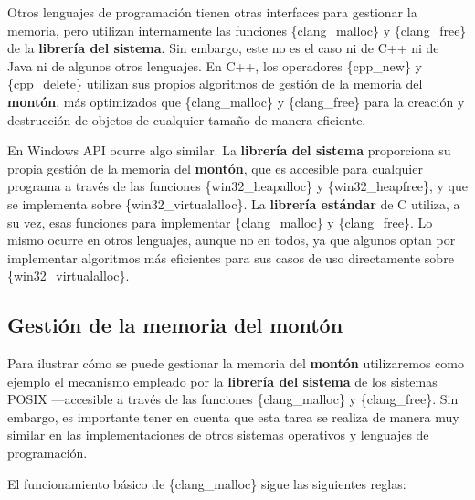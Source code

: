 Otros lenguajes de programación tienen otras interfaces para gestionar
la memoria, pero utilizan internamente las funciones \{clang\_malloc\} y
\{clang\_free\} de la \textbf{librería del sistema}. Sin embargo, este
no es el caso ni de C++ ni de Java ni de algunos otros lenguajes. En
C++, los operadores \{cpp\_new\} y \{cpp\_delete\} utilizan sus propios
algoritmos de gestión de la memoria del \textbf{montón}, más optimizados
que \{clang\_malloc\} y \{clang\_free\} para la creación y destrucción
de objetos de cualquier tamaño de manera eficiente.

En Windows API ocurre algo similar. La \textbf{librería del sistema}
proporciona su propia gestión de la memoria del \textbf{montón}, que es
accesible para cualquier programa a través de las funciones
\{win32\_heapalloc\} y \{win32\_heapfree\}, y que se implementa sobre
\{win32\_virtualalloc\}. La \textbf{librería estándar} de C utiliza, a
su vez, esas funciones para implementar \{clang\_malloc\} y
\{clang\_free\}. Lo mismo ocurre en otros lenguajes, aunque no en todos,
ya que algunos optan por implementar algoritmos más eficientes para sus
casos de uso directamente sobre \{win32\_virtualalloc\}.

\subsection{Gestión de la memoria del
montón}\label{_gestiuxf3n_de_la_memoria_del_montuxf3n}

Para ilustrar cómo se puede gestionar la memoria del \textbf{montón}
utilizaremos como ejemplo el mecanismo empleado por la \textbf{librería
del sistema} de los sistemas POSIX ---accesible a través de las
funciones \{clang\_malloc\} y \{clang\_free\}. Sin embargo, es
importante tener en cuenta que esta tarea se realiza de manera muy
similar en las implementaciones de otros sistemas operativos y lenguajes
de programación.

El funcionamiento básico de \{clang\_malloc\} sigue las siguientes
reglas:

